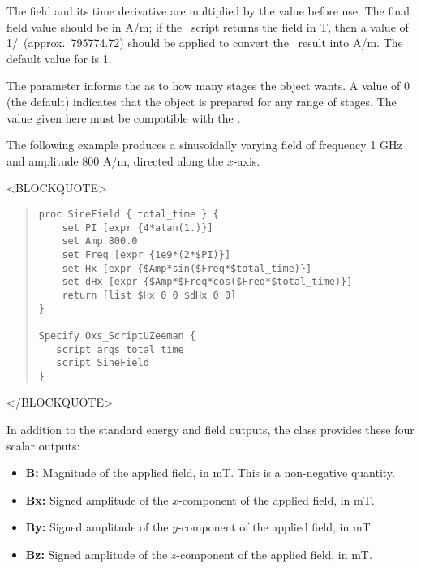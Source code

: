 \begin{itemize}
\begin{description}
   The field and its time derivative are multiplied by the
    value before use.  The final field value should
   be in A/m; if the \Tcl\ script returns the field in T, then a
    value of 1/\munaught\ (approx.\ 795774.72) should be
   applied to convert the \Tcl\ result into A/m.  The default value for
    is 1.

   The  parameter informs the
    as to how many stages the
    object wants.  A value of 0 (the default)
   indicates that the object is prepared for any range of stages.  The
    value given here must be compatible with the
   .

   The following example produces a sinusoidally varying field of
   frequency 1 GHz and amplitude 800 A/m, directed along the $x$-axis.
\begin{rawhtml}<BLOCKQUOTE>\end{rawhtml}
\begin{quote}
\begin{verbatim}
proc SineField { total_time } {
    set PI [expr {4*atan(1.)}]
    set Amp 800.0
    set Freq [expr {1e9*(2*$PI)}]
    set Hx [expr {$Amp*sin($Freq*$total_time)}]
    set dHx [expr {$Amp*$Freq*cos($Freq*$total_time)}]
    return [list $Hx 0 0 $dHx 0 0]
}

Specify Oxs_ScriptUZeeman {
   script_args total_time
   script SineField
}
\end{verbatim}
\end{quote}
\begin{rawhtml}</BLOCKQUOTE>\end{rawhtml}

   In addition to the standard energy and field outputs, the
    class provides these four scalar outputs:
   \begin{itemize}
   \item \textbf{B:} Magnitude of the applied field, in
   mT.  This is a non-negative quantity.
   \item \textbf{Bx:} Signed amplitude of the $x$-component
   of the applied field, in mT.
   \item \textbf{By:} Signed amplitude of the $y$-component
   of the applied field, in mT.
   \item \textbf{Bz:} Signed amplitude of the $z$-component
   of the applied field, in mT.
   \end{itemize}


\end{description}
\end{itemize}
